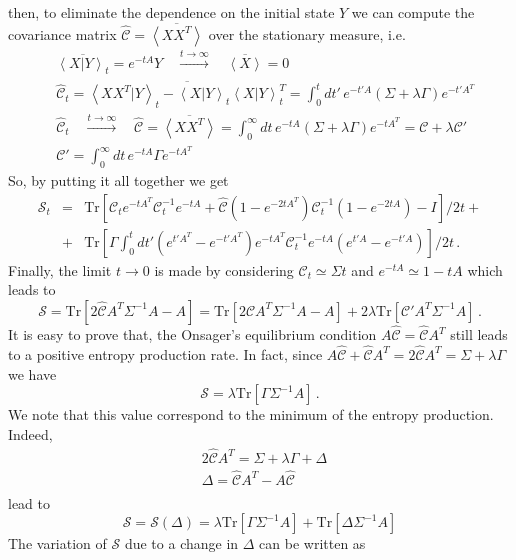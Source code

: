 \documentclass[12pt]{iopart}
\newcommand{\lx} {\left}
\newcommand{\rx} {\right}
\newcommand{\ave}[1] {\lx\langle #1 \rx\rangle}
\newcommand{\cS} {\mathcal{S}}
\newcommand{\cC} {\mathcal{C}}
\begin{document}
then, to eliminate the dependence on the initial state $Y$ we can compute the covariance matrix $\widehat{\cC} = \overline{\ave{XX^T}}$ over the stationary measure, i.e.
\begin{eqnarray}
    &\overline{\ave{X|Y}_t} = e^{-tA} Y \quad \overset{t\to\infty}{\longrightarrow} \quad \overline{\ave{X}} = 0 \\
    &\widehat{\cC}_t =\overline{\ave{XX^T|Y}_t - \ave{X|Y}_t \ave{X|Y}_t^T} = \int_0^t dt' \, e^{-t'A} \lx(\Sigma + \lambda \Gamma \rx) e^{-t' A^T} \\
    &\widehat{\cC}_t \quad \overset{t\to\infty}{\longrightarrow} \quad \widehat{\cC} = \overline{\ave{XX^T}} = \int_0^\infty dt \, e^{-tA} \lx(\Sigma + \lambda \Gamma \rx) e^{-t A^T} = \cC + \lambda \cC'\\
    &\cC' =  \int_0^\infty dt \, e^{-tA} \Gamma e^{-t A^T}
\end{eqnarray}
So, by putting it all together we get
\begin{eqnarray}
    \cS_t &=& \text{Tr}\lx[\cC_t e^{-tA^T} \cC_t^{-1} e^{-tA} + \widehat{\cC} (1-e^{-2tA^T})\cC_t^{-1} (1-e^{-2tA}) - I\rx]/2t+ \nonumber\\
    &+& \text{Tr}\lx[\Gamma \int_0^t dt' \lx(e^{t'A^T}-e^{-t'A^T}\rx) e^{-t A^T}\cC_t^{-1}e^{-t A}\lx(e^{t' A}-e^{-t' A}\rx)\rx] /2t\,.
\end{eqnarray}
Finally, the limit $t \to 0$ is made by considering $\cC_t \simeq \Sigma t$
and $e^{-tA}\simeq 1 - tA$ which leads to
\begin{equation}
    \cS = \text{Tr}\lx[2 \widehat{\cC}A^T \Sigma^{-1}A - A \rx] = 
     \text{Tr}\lx[2 \cC A^T \Sigma^{-1}A - A \rx] + 2\lambda \text{Tr} \lx[ \cC' A^T \Sigma^{-1} A \rx]\,.
\end{equation}
It is easy to prove that, the Onsager's equilibrium condition $A\widehat{\cC}=\widehat{\cC}A^T$ still leads to a positive entropy production rate.
In fact, since $A\widehat{\cC}+ \widehat{\cC}A^T=2\widehat{\cC}A^T=\Sigma+\lambda \Gamma$ we have
\begin{equation}
\cS = \lambda \text{Tr}\lx[\Gamma \Sigma^{-1}A\rx]\,.
\end{equation}
We note that this value correspond to the minimum of the entropy production. Indeed, 
\begin{align}
    &2\widehat{\cC}A^T=\Sigma+\lambda \Gamma+\Delta\,\\
    &\Delta = \widehat{\cC}A^T-A\widehat{\cC}\\
\end{align}
lead to
\begin{equation}
\cS = \cS(\Delta)= \lambda \text{Tr}\lx[\Gamma \Sigma^{-1}A\rx] + \text{Tr}\lx[\Delta \Sigma^{-1}A\rx]
\end{equation}
The variation of $\cS$ due to a change in $\Delta$ can be written as
\end{document}
